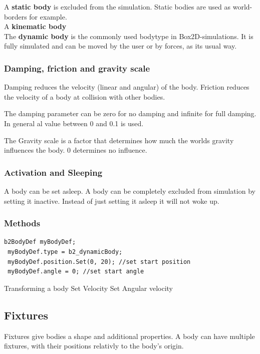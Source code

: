 \documentclass[10pt,a4paper,DIV=11]{scrreprt}
\begin{document}
A \textbf{static body} is excluded from the simulation. Static bodies are used as world-borders for example. \\

A \textbf{kinematic body} \\

The \textbf{dynamic body} is the commonly used bodytype in Box2D-simulations. It is fully simulated and can be moved by the user or by forces, as its usual way.

\subsubsection*{Damping, friction and gravity scale}
Damping reduces the velocity (linear and angular) of the body.
Friction reduces the velocity of a body at collision with other bodies.

The damping parameter can be zero for no damping and infinite for full damping. In general al value between 0 and 0.1 is used.

The Gravity scale is a factor that determines how much the worlds gravity influences the body. 0 determines no influence.

\subsubsection*{Activation and Sleeping}
A body can be set asleep.
A body can be completely excluded from simulation by setting it inactive.
Instead of just setting it asleep it will not woke up.

\subsubsection*{Methods}

\begin{lstlisting}[caption={Setting body definitions},label=lst:bodydef]
 b2BodyDef myBodyDef;
 myBodyDef.type = b2_dynamicBody;
 myBodyDef.position.Set(0, 20); //set start position
 myBodyDef.angle = 0; //set start angle
\end{lstlisting}


Transforming a body
Set Velocity
Set Angular velocity

\subsection{Fixtures}
Fixtures give bodies a shape and additional properties. A body can have multiple fixtures, with their positions relativly to the body's origin.
\end{document}
